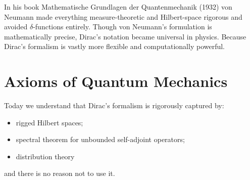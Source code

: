 In his book \cite{neumann-mfqm}  Mathematische Grundlagen der Quantenmechanik (1932) von Neumann made everything measure-theoretic and Hilbert-space rigorous and avoided $ \delta $-functions entirely.
Though von Neumann’s formulation is mathematically precise,
Dirac’s notation became universal in physics.
Because Dirac’s formalism is vastly more flexible and computationally powerful.

\section{Axioms of Quantum Mechanics}
\label{aqm}

Today we understand that Dirac’s formalism is rigorously captured by:
\begin{itemize}
   \item rigged Hilbert spaces;
\item spectral theorem for unbounded self-adjoint operators;
\item distribution theory
\end{itemize}
and there is no reason not to use it.

